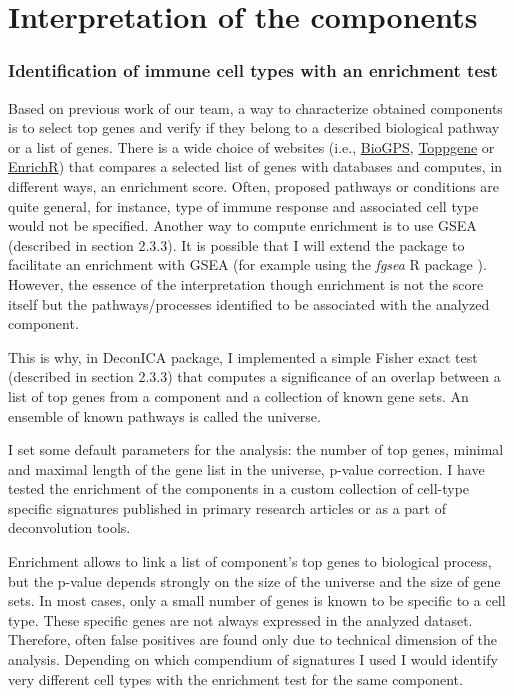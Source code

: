 \documentclass[12pt,]{book}
\theoremstyle{definition}
\theoremstyle{definition}
\theoremstyle{definition}
\theoremstyle{remark}
\begin{document}
\hypertarget{interpretation-of-the-components}{%
\section{Interpretation of the
components}\label{interpretation-of-the-components}}

\hypertarget{identification-of-immune-cell-types-with-an-enrichment-test}{%
\subsubsection{Identification of immune cell types with an enrichment
test}\label{identification-of-immune-cell-types-with-an-enrichment-test}}

Based on previous work of our team, a way to characterize obtained
components is to select top genes and verify if they belong to a
described biological pathway or a list of genes. There is a wide choice
of websites (i.e., \href{http://biogps.org/\#goto=welcome}{BioGPS},
\href{https://toppgene.cchmc.org/}{Toppgene} or
\href{http://amp.pharm.mssm.edu/Enrichr/}{EnrichR}) that compares a
selected list of genes with databases and computes, in different ways,
an enrichment score. Often, proposed pathways or conditions are quite
general, for instance, type of immune response and associated cell type
would not be specified. Another way to compute enrichment is to use GSEA
(described in section 2.3.3). It is possible that I will extend the
package to facilitate an enrichment with GSEA (for example using the
\emph{fgsea} R package \citep{Sergushichev2016}). However, the essence
of the interpretation though enrichment is not the score itself but the
pathways/processes identified to be associated with the analyzed
component.

This is why, in DeconICA package, I implemented a simple Fisher exact
test (described in section 2.3.3) that computes a significance of an
overlap between a list of top genes from a component and a collection of
known gene sets. An ensemble of known pathways is called the universe.

I set some default parameters for the analysis: the number of top genes,
minimal and maximal length of the gene list in the universe, p-value
correction. I have tested the enrichment of the components in a custom
collection of cell-type specific signatures published in primary
research articles or as a part of deconvolution tools.

Enrichment allows to link a list of component's top genes to biological
process, but the p-value depends strongly on the size of the universe
and the size of gene sets. In most cases, only a small number of genes
is known to be specific to a cell type. These specific genes are not
always expressed in the analyzed dataset. Therefore, often false
positives are found only due to technical dimension of the analysis.
Depending on which compendium of signatures I used I would identify very
different cell types with the enrichment test for the same component.
\end{document}
